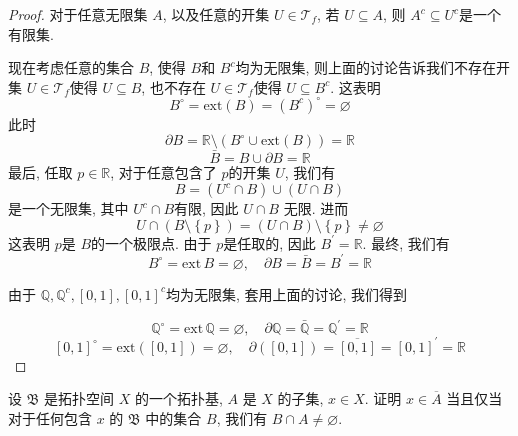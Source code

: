 \documentclass[../main.tex]{subfiles}
\begin{document}
\begin{proof}


 对于任意无限集 \(  A  \), 以及任意的开集 \(  U\in \mathcal{T}_{f}  \), 若 \(  U\subseteq A  \), 则 \(  A^{c}\subseteq U^{c}  \)是一个有限集.  

 现在考虑任意的集合 \(  B  \), 使得 \(  B  \)和 \(  B^{c} \)均为无限集, 则上面的讨论告诉我们不存在开集 \(  U\in \mathcal{T}_{f}  \)使得 \(  U\subseteq B  \), 也不存在 \(  U\in \mathcal{T}_{f}  \)使得 \(  U\subseteq B^{c}  \). 这表明 \[
 B^{\circ}=  \mathrm{ext}\left( B \right)=   \left( B^{c} \right)^{\circ }= \varnothing  
 \]       此时 \[
  \partial B= \mathbb{R} \setminus \left( B^{\circ}\cup \mathrm{ext}\left( B \right)  \right)= \mathbb{R}   
 \] \[
 \bar{B}= B\cup  \partial B= \mathbb{R} 
 \]最后, 任取 \(  p \in\mathbb{R}   \), 对于任意包含了 \(  p  \)的开集 \(  U  \), 我们有 \[
 B= \left( U^{c}\cap B \right)\cup \left( U\cap B \right)  
 \]是一个无限集, 其中 \(  U^{c}\cap B  \)有限, 因此 \(  U\cap B  \)     无限. 进而 \[
  U\cap \left( B\setminus \left\{ p \right\} \right)= \left( U\cap B \right)\setminus \left\{ p \right\}  \neq \varnothing
 \]这表明 \(  p  \)是 \(  B  \)的一个极限点. 由于 \(  p  \)是任取的, 因此 \(  B^{\prime} = \mathbb{R}   \). 最终, 我们有 \[
 B^{\circ} = \mathrm{ext}\,B= \varnothing, \quad  \partial B= \bar{B}= B^{\prime} = \mathbb{R} 
 \]    

 由于 \(  \mathbb{Q} , \mathbb{Q} ^{c}, \left[ 0,1 \right], \left[ 0,1 \right]^{c}    \)均为无限集, 套用上面的讨论, 我们得到 
  
    \[
    \mathbb{Q} ^{\circ}= \mathrm{ext}\,\mathbb{Q} = \varnothing, \quad  \partial \mathbb{Q} = \bar{\mathbb{Q}}= \mathbb{Q} ^{\prime} = \mathbb{R} 
    \]       \[
    \left[ 0,1 \right]^{\circ}= \mathrm{ext}\left( \left[ 0,1 \right]  \right)= \varnothing,\quad  \partial \left( \left[ 0,1 \right]  \right)= \overline{\left[ 0,1 \right] }=  \left[ 0,1 \right]^{\prime} = \mathbb{R}     
    \]    
\end{proof}

\begin{exercise}{}{}
设 $\mathfrak{B}$ 是拓扑空间 $X$ 的一个拓扑基, $A$ 是 $X$ 的子集, $x \in X$. 证明 $x \in \overline{A}$ 当且仅当对于任何包含 $x$ 的 $\mathfrak{B}$ 中的集合 $B$, 我们有 $B \cap A \neq \varnothing$.
\end{exercise}
\end{document}
